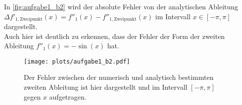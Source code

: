     In \autoref{fig:aufgabe1_b2} wird der absolute Fehler von der analytischen Ableitung $\Delta f'_{\mathrm{1,Zweipunkt}}(x) = f''_1(x) - f''_{\mathrm{1,Zweipunkt}}(x)$ im Intervall $x \in [-\pi, \pi]$ dargestellt. \\
    Auch hier ist deutlich zu erkennen, dass der Fehler der Form der zweiten Ableitung $f''_1(x) = -\sin(x)$ hat.

    \begin{figure}[H]
      \centering
      \texttt{[image: plots/aufgabe1\_b2.pdf]} \vspace*{-0.6cm}
      \caption{Der Fehler zwischen der numerisch und analytisch bestimmten zweiten Ableitung ist hier dargestellt und im Intervall $[-\pi, \pi]$ gegen $x$ aufgetragen.}
      \label{fig:aufgabe1_b2}
    \end{figure}
    \FloatBarrier


